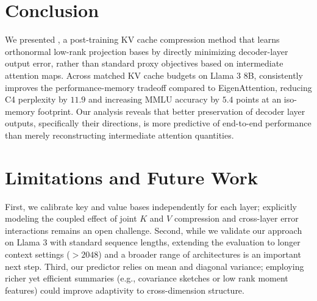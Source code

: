 \section{Conclusion}
We presented \methodname, a post-training KV cache compression method that learns orthonormal low-rank projection bases by directly minimizing decoder-layer output error, rather than standard proxy objectives based on intermediate attention maps.
Across matched KV cache budgets on Llama 3 8B, \methodname consistently improves the performance-memory tradeoff compared to EigenAttention, reducing C4 perplexity by $11.9$ and increasing MMLU accuracy by $5.4$ points at an iso-memory footprint.
Our analysis reveals that better preservation of decoder layer outputs, specifically their directions, is more predictive of end-to-end performance than merely reconstructing intermediate attention quantities.

\section*{Limitations and Future Work}
First, we calibrate key and value bases independently for each layer; explicitly modeling the coupled effect of joint $K$ and $V$ compression and cross-layer error interactions remains an open challenge.
Second, while we validate our approach on Llama 3 with standard sequence lengths, extending the evaluation to longer context settings ($>2048$) and a broader range of architectures is an important next step.
Third, our predictor relies on mean and diagonal variance; employing richer yet efficient summaries (e.g., covariance sketches or low rank moment features) could improve adaptivity to cross-dimension structure.

